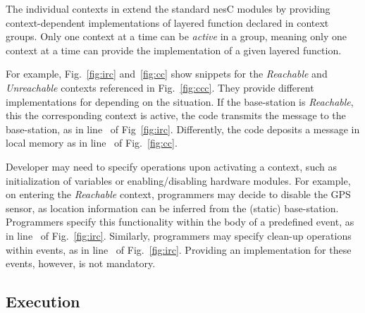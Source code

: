 

The individual contexts in \conesc extend the standard nesC modules by
providing context-dependent implementations of layered function
declared in context groups. Only one context at a time can be
\emph{active} in a group, meaning only one context at a time can
provide the implementation of a given layered function.

For example, Fig.~\ref{fig:irc} and~\ref{fig:cc} show \conesc snippets
for the \emph{Reachable} and \emph{Unreachable} contexts referenced in
Fig.~\ref{fig:ccc}. They provide different implementations for
 depending on the situation. If the base-station is
\emph{Reachable}, this the corresponding context is active, the code
transmits the message to the base-station, as in
line~ of Fig~\ref{fig:irc}. Differently, the code
deposits a message in local memory as in line~ of
Fig.~\ref{fig:cc}.

Developer may need to specify operations upon activating a context,
such as initialization of variables or enabling/disabling hardware
modules. For example, on entering the \emph{Reachable} context,
programmers may decide to disable the GPS sensor, as location
information can be inferred from the (static)
base-station. Programmers specify this functionality within the body
of a predefined  event, as in
line~ of Fig.~\ref{fig:irc}. Similarly,
programmers may specify clean-up operations within 
events, as in line~ of
Fig.~\ref{fig:irc}.  Providing an implementation for these events,
however, is not mandatory.

\subsection{Execution}\label{subsec:usage}



